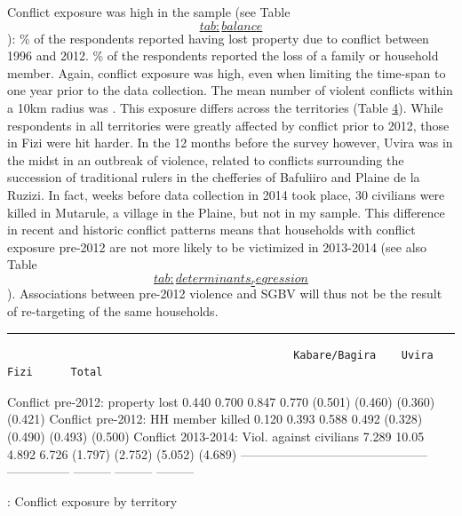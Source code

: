 \documentclass[
]{article}
\begin{document}
Conflict exposure was high in the sample (see Table
\hyperref[tab:balance]{\[tab:balance\]}): \% of the respondents reported
having lost property due to conflict between 1996 and 2012. \% of the
respondents reported the loss of a family or household member. Again,
conflict exposure was high, even when limiting the time-span to one year
prior to the data collection. The mean number of violent conflicts
within a 10km radius was . This exposure differs across the territories
(Table \hyperref[tab:conflict_by_terr]{4}). While respondents in all
territories were greatly affected by conflict prior to 2012, those in
Fizi were hit harder. In the 12 months before the survey however, Uvira
was in the midst in an outbreak of violence, related to conflicts
surrounding the succession of traditional rulers in the chefferies of
Bafuliiro and Plaine de la Ruzizi. In fact, weeks before data collection
in 2014 took place, 30 civilians were killed in Mutarule, a village in
the Plaine, but not in my sample. This difference in recent and historic
conflict patterns means that households with conflict exposure pre-2012
are not more likely to be victimized in 2013-2014 (see also Table
\hyperref[tab:determinants_regression]{\[tab:determinants_regression\]}).
Associations between pre-2012 violence and SGBV will thus not be the
result of re-targeting of the same households.

\label{tab:conflict_by_terr}
\begin{center}\rule{0.5\linewidth}{0.5pt}\end{center}

\begin{verbatim}
                                             Kabare/Bagira    Uvira     Fizi      Total
\end{verbatim}

Conflict pre-2012: property lost 0.440 0.700 0.847 0.770 (0.501) (0.460)
(0.360) (0.421) Conflict pre-2012: HH member killed 0.120 0.393 0.588
0.492 (0.328) (0.490) (0.493) (0.500) Conflict 2013-2014: Viol. against
civilians 7.289 10.05 4.892 6.726 (1.797) (2.752) (5.052) (4.689)
--------------------------------------------- --------------- ---------
--------- ---------

: Conflict exposure by territory
\end{document}
